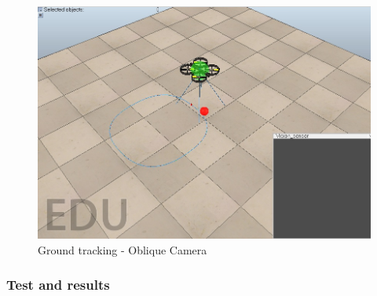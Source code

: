 \begin{figure}[h]
	\centering
	\includegraphics[width=0.7\linewidth]{../Images/c3/ground_tracking_scene_vertical}
	\caption{Ground tracking - Oblique Camera}
	\label{fig:ground_tracking_scene_vertical}
\end{figure}

\subsubsection{Test and results}


